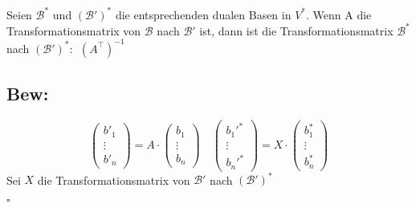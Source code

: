 \documentclass[titlepage,12pt,a4paper,ngerman]{report}
\newenvironment{bew}[1]{\subsection{Bew: #1}}{\hfill$\square$}
\newcommand{\Bew}[2]{\begin{bew}{#1}#2\end{bew}}
\begin{document}
Seien $ \mathcal{B}^* $ und $ (\mathcal{B}')^* $ die entsprechenden dualen Basen in $ V^* $. Wenn A die Transformationsmatrix von $ \mathcal{B} $ nach $ \mathcal{B}' $ ist, dann ist die Transformationsmatrix $ \mathcal{B^*} $ nach $ (\mathcal{B}')^* : \ \ (A^\top)^{-1}$
\Bew{}{
$$\begin{pmatrix}
b'_1\\
\vdots\\
b'_n
\end{pmatrix} = A \cdot \begin{pmatrix}
b_1\\
\vdots\\
b_n
\end{pmatrix} \quad \begin{pmatrix}
b_1'^*\\
\vdots\\
b_n'^*
\end{pmatrix} = X \cdot \begin{pmatrix}
b_1^*\\
\vdots\\
b_n^*
\end{pmatrix}$$
Sei $ X $ die Transformationsmatrix von $ \mathcal{B}' $ nach $ (\mathcal{B}') ^* $

}
\end{document}
